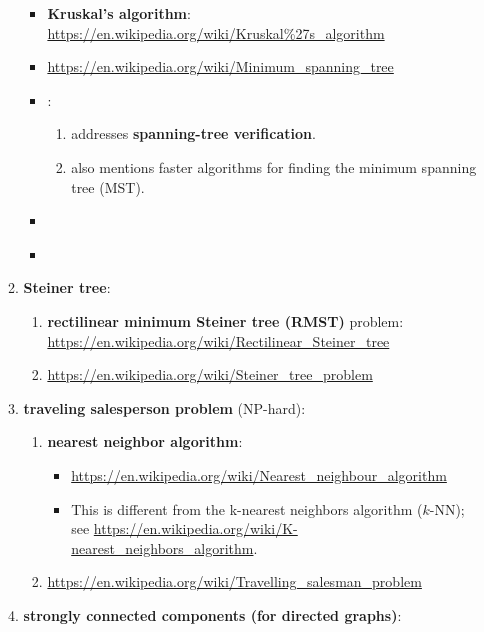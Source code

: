 \begin{enumerate}
\begin{enumerate}
\begin{itemize}
		\item {\bf Kruskal's algorithm}: \url{https://en.wikipedia.org/wiki/Kruskal%27s_algorithm}
		\item \url{https://en.wikipedia.org/wiki/Minimum_spanning_tree}
		\item \cite[\S23]{Cormen2009}: %
			\begin{enumerate} %
			\item \cite[\S23.Chapter notes, pp. 642]{Cormen2009} addresses {\bf spanning-tree verification}.
			\item \cite[\S23.Chapter notes, pp. 642]{Cormen2009} also mentions faster algorithms for finding the minimum spanning tree (MST).
			\end{enumerate}
		\item \cite[\S13.6]{Goodrich2011}
		\item \cite[\S14.7]{Goodrich2013}
		\end{itemize}
	\item {\bf Steiner tree}: \vspace{-0.2cm}
		\begin{enumerate} \itemsep -2pt
		\item {\bf rectilinear minimum Steiner tree (RMST)} problem: \url{https://en.wikipedia.org/wiki/Rectilinear_Steiner_tree}
		\item \url{https://en.wikipedia.org/wiki/Steiner_tree_problem}
		\end{enumerate}
	\item {\bf traveling salesperson problem} (NP-hard): \vspace{-0.2cm}
		\begin{enumerate} \itemsep -2pt
		\item {\bf nearest neighbor algorithm}: \vspace{-0.1cm}
			\begin{itemize} \itemsep -1pt
			\item \url{https://en.wikipedia.org/wiki/Nearest_neighbour_algorithm}
			\item This is different from the k-nearest neighbors algorithm ($k$-NN); see \url{https://en.wikipedia.org/wiki/K-nearest_neighbors_algorithm}.
			\end{itemize}
		\item \url{https://en.wikipedia.org/wiki/Travelling_salesman_problem}
		\end{enumerate}
	\item {\bf strongly connected components (for directed graphs)}: \vspace{-0.2cm}

\end{enumerate}
\end{enumerate}

